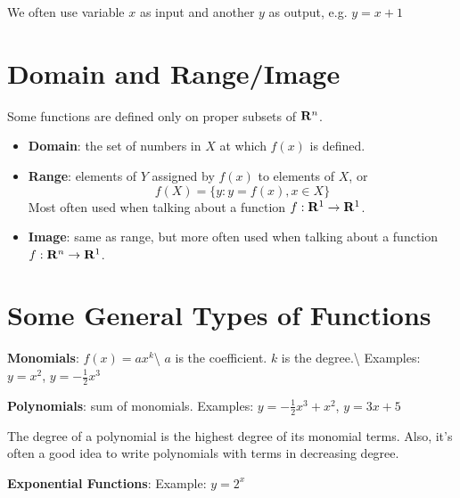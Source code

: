 \documentclass[]{book}
\providecommand{\tightlist}{%
  \setlength{\itemsep}{0pt}\setlength{\parskip}{0pt}}
\theoremstyle{definition}
\theoremstyle{definition}
\theoremstyle{definition}
\theoremstyle{remark}
\begin{document}
We often use variable \(x\) as input and another \(y\) as output, e.g.
\(y=x+1\)

\section{Domain and Range/Image}\label{domain-and-rangeimage}

Some functions are defined only on proper subsets of \({\bf R}^n\).

\begin{itemize}
\tightlist
\item
  \textbf{Domain}: the set of numbers in \(X\) at which \(f(x)\) is
  defined.
\item
  \textbf{Range}: elements of \(Y\) assigned by \(f(x)\) to elements of
  \(X\), or \[f(X)=\{ y : y=f(x), x\in X\}\] Most often used when
  talking about a function \(f:{\bf R}^1\to{\bf R}^1\).
\item
  \textbf{Image}: same as range, but more often used when talking about
  a function \(f:{\bf R}^n\to{\bf R}^1\).
\end{itemize}

\section{Some General Types of
Functions}\label{some-general-types-of-functions}

\textbf{Monomials}: \(f(x)=a x^k\)\textbackslash{} \(a\) is the
coefficient. \(k\) is the degree.\textbackslash{} Examples: \(y=x^2\),
\(y=-\frac{1}{2}x^3\)

\textbf{Polynomials}: sum of monomials. Examples:
\(y=-\frac{1}{2}x^3+x^2\), \(y=3x+5\)

The degree of a polynomial is the highest degree of its monomial terms.
Also, it's often a good idea to write polynomials with terms in
decreasing degree.

\textbf{Exponential Functions}: Example: \(y=2^x\)

\end{document}
